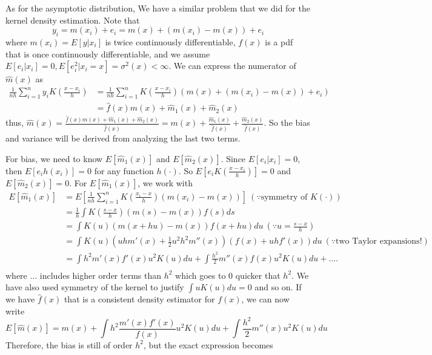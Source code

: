 \documentclass[12pt]{article}
\theoremstyle{definition}
\theoremstyle{property}
\theoremstyle{assumption}
\theoremstyle{example}
\theoremstyle{comment}
\begin{document}
 As for the asymptotic distribution, We have a similar problem that we did for the kernel density estimation.  Note that
 \[
 y_i = m(x_i)+e_i = m(x) + (m(x_i)-m(x))+e_i
 \]
where $m(x_i)=E[y|x_i]$ is twice continuously differentiable, $f(x)$ is a pdf that is once continuously differentiable, and we assume $E[e_i|x_i]=0, E[e_i^2|x_i=x]=\sigma^2(x)<\infty$. We can express the numerator of $\hat{m}(x)$ as 
\[\begin{aligned}
\frac{1}{nh}\sum_{i=1}^n y_iK\left(\frac{x-x_i}{h}\right) &=\frac{1}{nh}\sum_{i=1}^n K\left(\frac{x-x_i}{h}\right) (m(x) + (m(x_i)-m(x) )+ e_i)\\ 
&=\hat{f}(x)m(x) + \hat{m}_1(x)+\hat{m}_2(x)
\end{aligned}\]
thus, $\hat{m}(x)=\frac{\hat{f}(x)m(x) + \hat{m}_1(x)+\hat{m}_2(x)}{\hat f(x)}= m(x)+\frac{\hat{m}_1(x)}{\hat{f}(x)}+\frac{\hat{m}_2(x)}{\hat{f}(x)}$. So the bias and variance will  be derived from analyzing the last two terms. 
\par
For bias, we need to know $E[\hat{m}_1(x)]$ and  $E[\hat{m}_2(x)]$. Since $E[e_i|x_i]=0$, then $E[e_ih(x_i)]=0$ for any function $h(\cdot)$. So $E\left[e_iK\left(\frac{x-x_i}{h}\right) \right]=0$ and $E[\hat{m}_2(x)]=0$. For $E[\hat{m}_1(x)]$, we work with
\footnotesize{\[\begin{aligned}
E[\hat{m}_1(x)]&=E\left[ \frac{1}{nh}\sum_{i=1}^n K\left(\frac{x_i-x}{h}\right) (m(x_i)-m(x))\right] \ (\because \text{symmetry of } K(\cdot))\\
&= \frac{1}{h}\int K\left(\frac{s-x}{h}\right) (m(s)-m(x))f(s)ds \\
&= \int K\left(u\right) (m(x+hu)-m(x))f(x+hu)du \ \left(\because u=\frac{s-x}{h}\right)\\
&= \int K\left(u\right) (uh m'(x)+ \frac{1}{2}u^2h^2 m''(x)) (f(x)+uhf'(x))du \ \left(\because \text{two Taylor expansions!}\right)\\
&=\int h^2m'(x)f'(x) u^2 K\left(u\right)du +\int \frac{h^2}{2} m''(x)f(x) u^2K(u)du + .... \\
\end{aligned}\]}\normalsize
where ... includes higher order terms than $h^2$ which goes to 0 quicker that $h^2$. We have also used symmetry of the kernel to justify $\int u K(u)du=0$ and so on. If we have $\hat{f}(x)$ that is a consistent density estimator for $f(x)$, we can now write
\[
E[\hat{m}(x)]=m(x) + \int h^2\frac{m'(x)f'(x)}{f(x)} u^2 K\left(u\right)du +\int \frac{h^2}{2} m''(x)u^2K(u)du
\]
Therefore, the bias is still of order $h^2$, but the exact expression becomes
\end{document}
